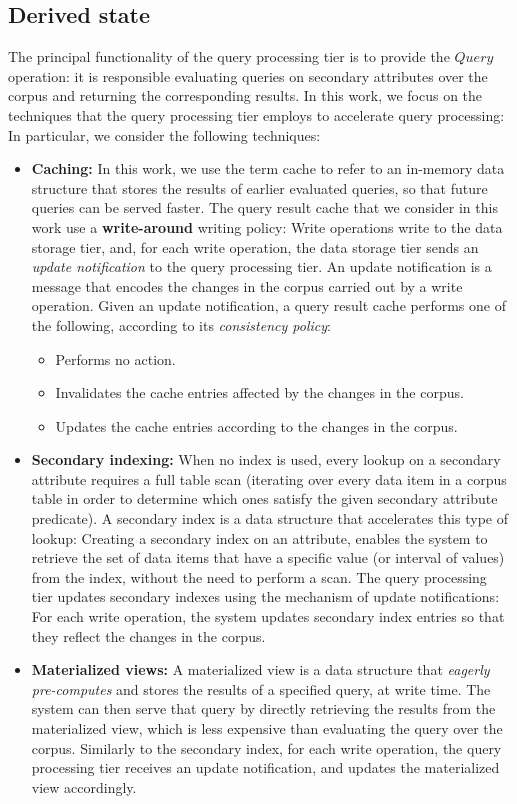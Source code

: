 \subsection{Derived state}
\label{sec:models_derived_state}
The principal functionality of the query processing tier is to provide the $Query$ operation:
it is responsible evaluating queries on secondary attributes over the corpus and returning the corresponding results.
In this work, we focus on the techniques that the query processing tier employs to accelerate query processing:
In particular, we consider the following techniques:
\begin{itemize}
  \item \textbf{Caching:}
  In this work, we use the term cache to refer to an in-memory data structure that stores the results
  of earlier evaluated queries, so that future queries can be served faster.
  The query result cache that we consider in this work use a \textbf{write-around} writing policy:
  Write operations write to the data storage tier, and,
  for each write operation, the data storage tier sends an \textit{update notification} to the query processing tier.
  An update notification is a message that encodes the changes in the corpus carried out by a write operation.
  Given an update notification, a query result cache performs one of the following,
  according to its \textit{consistency policy}:
  \begin{itemize}
    \item Performs no action.
    \item Invalidates the cache entries affected by the changes in the corpus.
    \item Updates the cache entries according to the changes in the corpus.
  \end{itemize}
  \item \textbf{Secondary indexing:}
  When no index is used, every lookup on a secondary attribute requires a full table scan (iterating over every data item
  in a corpus table in order to determine which ones satisfy the given secondary attribute predicate).
  A secondary index is a data structure that accelerates this type of lookup:
  Creating a secondary index on an attribute,
  enables the system to retrieve the set of data items that have a specific value (or interval of values) from the index,
  without the need to perform a scan.
  The query processing tier updates secondary indexes using the mechanism of update notifications:
  For each write operation, the system updates secondary index entries so that they reflect the changes in the corpus.
  \item \textbf{Materialized views:}
  A materialized view is a data structure that \textit{eagerly pre-computes} and stores the results of a specified query,
  at write time.
  The system can then serve that query by directly retrieving the results from the materialized view,
  which is less expensive than evaluating the query over the corpus.
  Similarly to the secondary index, for each write operation, the query processing tier receives an update notification,
  and updates the materialized view accordingly.
\end{itemize}

